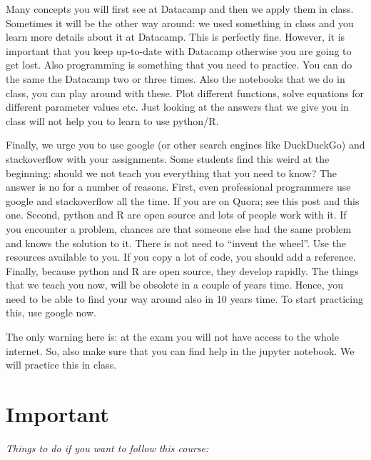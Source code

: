 \documentclass[]{book}
\begin{document}
Many concepts you will first see at Datacamp and then we apply them in
class. Sometimes it will be the other way around: we used something in
class and you learn more details about it at Datacamp. This is perfectly
fine. However, it is important that you keep up-to-date with Datacamp
otherwise you are going to get lost. Also programming is something that
you need to practice. You can do the same the Datacamp two or three
times. Also the notebooks that we do in class, you can play around with
these. Plot different functions, solve equations for different parameter
values etc. Just looking at the answers that we give you in class will
not help you to learn to use python/R.

Finally, we urge you to use google (or other search engines like
DuckDuckGo) and stackoverflow with your assignments. Some students find
this weird at the beginning: should we not teach you everything that you
need to know? The answer is no for a number of reasons. First, even
professional programmers use google and stackoverflow all the time. If
you are on Quora; see this post and this one. Second, python and R are
open source and lots of people work with it. If you encounter a problem,
chances are that someone else had the same problem and knows the
solution to it. There is not need to ``invent the wheel''. Use the
resources available to you. If you copy a lot of code, you should add a
reference. Finally, because python and R are open source, they develop
rapidly. The things that we teach you now, will be obsolete in a couple
of years time. Hence, you need to be able to find your way around also
in 10 years time. To start practicing this, use google now.

The only warning here is: at the exam you will not have access to the
whole internet. So, also make sure that you can find help in the jupyter
notebook. We will practice this in class.

\chapter{Important}\label{important-1}

\emph{Things to do if you want to follow this course:}
\end{document}
